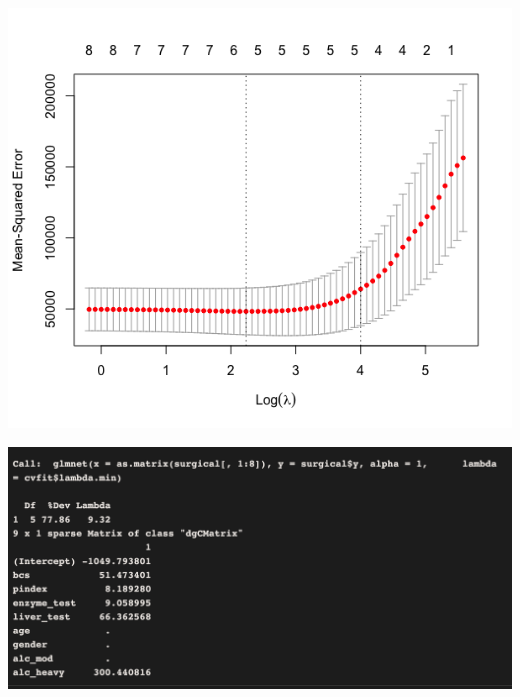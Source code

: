 \documentclass[compress]{beamer}
\begin{document}
\begin{frame}

\includegraphics[scale=.55]{figs8/CVfitLasso.png} \\


\end{frame}

\begin{frame}

\includegraphics[scale=.4]{figs8/Screen Shot Lasso Results.png} \\


\end{frame}
\end{document}
